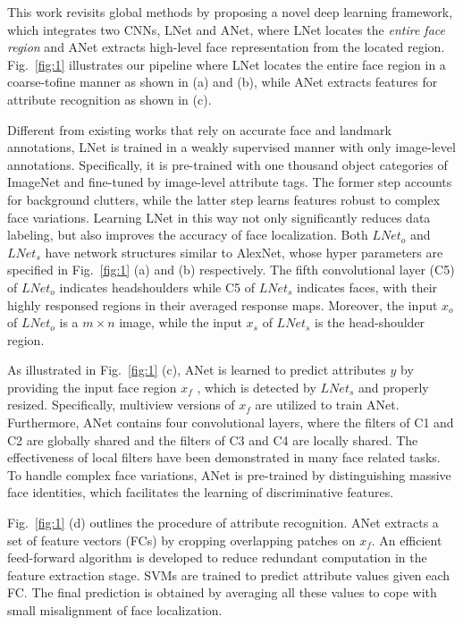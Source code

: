 \documentclass[10pt,twocolumn,letterpaper]{article}
\begin{document}
This work revisits global methods by proposing a novel deep learning framework, which integrates two CNNs, LNet and ANet, where LNet locates the \emph{entire face region} and ANet extracts high-level face representation from the located region. Fig.~\ref{fig:1} illustrates our pipeline where LNet locates the entire face region in a coarse-tofine manner as shown in (a) and (b), while ANet extracts features for attribute recognition as shown in (c).

Different from existing works that rely on accurate face and landmark annotations, LNet is trained in a weakly supervised manner with only image-level annotations. Specifically, it is pre-trained with one thousand object categories of ImageNet \cite{Deng2009ImageNet} and fine-tuned by image-level attribute tags. The former step accounts for background clutters, while the latter step learns features robust to complex face variations. Learning LNet in this way not only significantly reduces data labeling, but also improves the accuracy of face localization. Both $LNet_o$ and $LNet_s$ have network structures similar to AlexNet, whose hyper parameters are specified in Fig.~\ref{fig:1} (a) and (b) respectively. The fifth convolutional layer (C5) of $LNet_o$ indicates headshoulders while C5 of $LNet_s$ indicates faces, with their highly responsed regions in their averaged response maps. Moreover, the input $x_o$ of $LNet_o$ is a $m \times n$ image, while the input $x_s$ of $LNet_s$ is the head-shoulder region.

As illustrated in Fig.~\ref{fig:1} (c), ANet is learned to predict attributes $y$ by providing the input face region $x_f$ , which is detected by $LNet_s$ and properly resized. Specifically, multiview versions of $x_f$ are utilized to train ANet. Furthermore, ANet contains four convolutional layers, where the filters of C1 and C2 are globally shared and the filters of C3 and C4 are locally shared. The effectiveness of local filters have been demonstrated in many face related tasks. To handle complex face variations, ANet is pre-trained by distinguishing massive face identities, which facilitates the learning of discriminative features. 

Fig.~\ref{fig:1} (d) outlines the procedure of attribute recognition. ANet extracts a set of feature vectors (FCs) by cropping overlapping patches on $x_f$. An efficient feed-forward algorithm is developed to reduce redundant computation in the feature extraction stage. SVMs \cite{Fan2008LIBLINEAR} are trained to predict attribute values given each FC. The final prediction is obtained by averaging all these values to cope with small misalignment of face localization.
\end{document}
